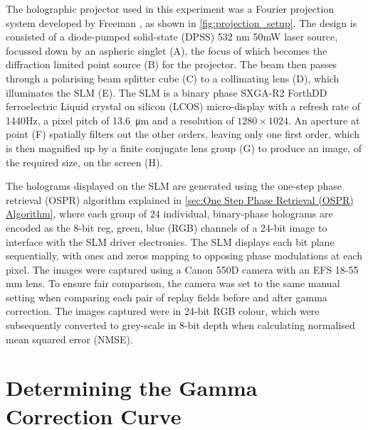 The holographic projector used in this experiment was a Fourier projection system developed by Freeman \cite{Freeman2009}, as shown in \cref{fig:projection_setup}. The design is consisted of a diode-pumped solid-state (DPSS) 532 nm 50mW laser source, focussed down by an aspheric singlet (A), the focus of which becomes the diffraction limited point source (B) for the projector. The beam then passes through a polarising beam splitter cube (C) to a collimating lens (D), which illuminates the SLM (E). The SLM is a binary phase SXGA-R2 ForthDD ferroelectric Liquid crystal on silicon (LCOS) micro-display with a refresh rate of 1440Hz, a pixel pitch of \SI{13.6}{\micro\metre} and a resolution of $1280\times1024$. An aperture at point (F) spatially filters out the other orders, leaving only one first order, which is then magnified up by a finite conjugate lens group (G) to produce an image, of the required size, on the screen (H). \cite{Freeman2009}

The holograms displayed on the SLM are generated using the one-step phase retrieval (OSPR) algorithm \cite{Cable2006} explained in \cref{sec:One Step Phase Retrieval (OSPR) Algorithm}, where each group of 24 individual, binary-phase holograms are encoded as the 8-bit reg, green, blue (RGB) channels of a 24-bit image to interface with the SLM driver electronics. The SLM displays each bit plane sequentially, with ones and zeros mapping to opposing phase modulations at each pixel. The images were captured using a Canon 550D camera with an EFS 18-55 mm lens. To ensure fair comparison, the camera was set to the same manual setting when comparing each pair of replay fields before and after gamma correction. The images captured were in 24-bit RGB colour, which were subsequently converted to grey-scale in 8-bit depth when calculating normalised mean squared error (NMSE).



\section{Determining the Gamma Correction Curve}\label{sec:Determining the gamma correction curve}


